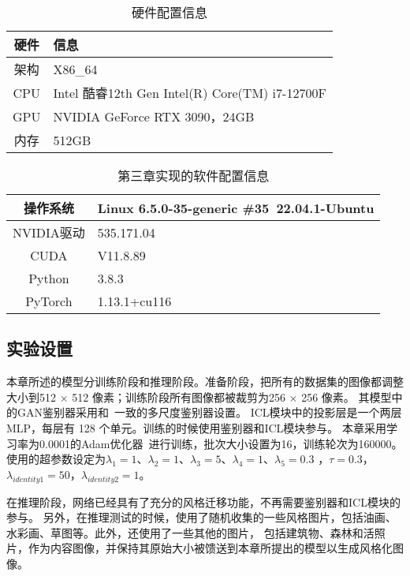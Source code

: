 
\begin{table}[htbp]
    \caption{\label{tab:tab_hardware}硬件配置信息}
    \begin{tabularx}{\linewidth}{c|X<{\centering}}
        \hline
        硬件 & 信息 \\ \hline
        架构 & X86\_64 \\ \hline
        CPU & Intel 酷睿12th Gen Intel(R) Core(TM) i7-12700F \\ \hline
        GPU & NVIDIA GeForce RTX 3090，24GB \\ \hline
        内存 & 512GB \\ \hline
    \end{tabularx}
\end{table}
\begin{table}[htbp]
    \caption{\label{tab:tab_software}第三章实现的软件配置信息}
    \begin{tabularx}{\linewidth}{c|X<{\centering}}
        \hline
        操作系统 & Linux 6.5.0-35-generic \#35~22.04.1-Ubuntu \\ \hline
        NVIDIA驱动 & 535.171.04 \\ \hline
        CUDA & V11.8.89 \\ \hline
        Python & 3.8.3 \\ \hline
        PyTorch & 1.13.1+cu116 \\ \hline
    \end{tabularx}
\end{table}
\subsection{实验设置}
本章所述的模型分训练阶段和推理阶段。准备阶段，把所有的数据集的图像都调整大小到512 $\times$  512 像素；训练阶段所有图像都被裁剪为256 $\times$ 256 像素。
其模型中的GAN鉴别器采用和~\cite{wang2018high}一致的多尺度鉴别器设置。
ICL模块中的投影层是一个两层 MLP，每层有 128 个单元。训练的时候使用鉴别器和ICL模块参与。
本章采用学习率为0.0001的Adam优化器~\cite{diederik2014adam}进行训练，批次大小设置为16，训练轮次为160000。
使用的超参数设定为$\lambda_1=1$、$\lambda_2  =1$、$\lambda_3=5$、$\lambda_4=1$、$\lambda_5=0.3$ ，$\tau=0.3$，$\lambda_{identity1}=50$，$\lambda_{identity2}=1$。
\par 在推理阶段，网络已经具有了充分的风格迁移功能，不再需要鉴别器和ICL模块的参与。
另外，在推理测试的时候，使用了随机收集的一些风格图片，包括油画、水彩画、草图等。此外，还使用了一些其他的图片，
包括建筑物、森林和活照片，作为内容图像，并保持其原始大小被馈送到本章所提出的模型以生成风格化图像。

